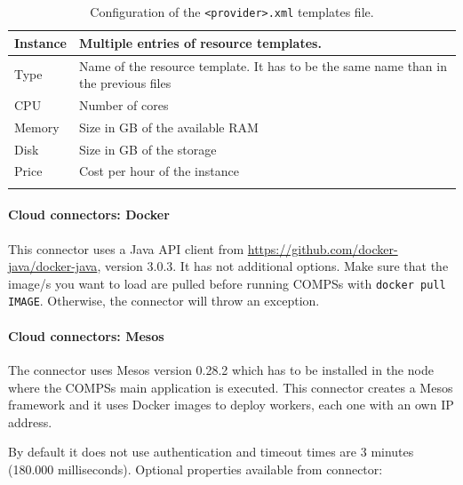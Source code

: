 \newpage

\bgroup
  \def\arraystretch{1.5}
  \begin{longtable}{| p{} | p{} |}
      \hline
      \textbf{Instance} 	& Multiple entries of resource templates. \\ \hline
      Type   			& Name of the resource template. It has to be the same name than in the previous files \\ \hline
      CPU    			& Number of cores \\ \hline
      Memory 			& Size in GB of the available RAM \\ \hline
      Disk   			& Size in GB of the storage \\ \hline
      Price  			& Cost per hour of the instance \\ \hline
      \caption{Configuration of the \texttt{<provider>.xml} templates file.}
      \label{tab:rOCCI_configuration}
  \end{longtable}
\egroup


\paragraph{Cloud connectors: Docker}

This connector uses a Java API client from \url{https://github.com/docker-java/docker-java}, version 3.0.3. It has not additional options. Make sure that the image/s you want to load are pulled before running COMPSs with \texttt{docker pull IMAGE}. Otherwise, the connector will throw an exception.

\paragraph{Cloud connectors: Mesos}

The connector uses Mesos version 0.28.2 which has to be installed in the node where the COMPSs main application is executed. This connector creates a Mesos framework and it uses Docker images to deploy workers, each one with an own IP address. 

By default it does not use authentication and timeout times are 3 minutes (180.000 milliseconds). Optional properties available from connector:

